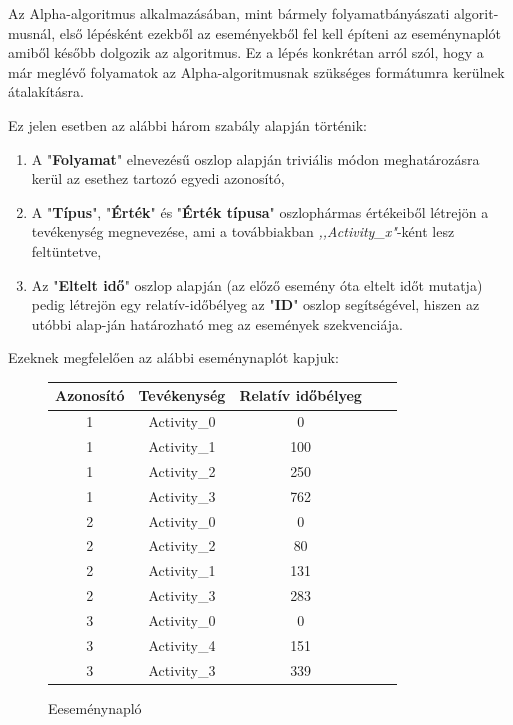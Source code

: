 Az Alpha-algoritmus alkalmazásában, mint bármely folyamatbányászati algorit\hyp{}musnál, első lépésként ezekből az eseményekből fel kell építeni az eseménynaplót amiből később dolgozik az algoritmus. Ez a lépés konkrétan arról szól, hogy a már meglévő folyamatok az Alpha-algoritmusnak szükséges formátumra kerülnek átalakításra.

Ez jelen esetben az alábbi három szabály alapján történik:
\begin{enumerate}
	\item A "\textbf{Folyamat}" elnevezésű oszlop alapján triviális módon meghatározásra kerül az esethez tartozó egyedi azonosító,
	\item A "\textbf{Típus}", "\textbf{Érték}" és "\textbf{Érték típusa}" oszlophármas értékeiből létrejön a tevékenység megnevezése,  ami a továbbiakban \textit{,,Activity\_{x}"}-ként lesz feltüntetve,
	\item Az "\textbf{Eltelt idő}" oszlop alapján (az előző esemény óta eltelt időt mutatja) pedig létrejön egy relatív-időbélyeg az "\textbf{ID}" oszlop segítségével, hiszen az utóbbi alap\hyp{}ján határozható meg az események szekvenciája.
\end{enumerate}

\newpage

Ezeknek megfelelően az alábbi eseménynaplót kapjuk:

\begin{figure}[h]
\begin{center}
\caption{Eeseménynapló}
\begin{tabular}{|| c | c | c | c | c |  ||}
	\hline
	Azonosító & Tevékenység & Relatív időbélyeg \\ [0.5ex]
	\hline\hline
	1 & Activity\_0 & 0 \\
	\hline
	1 & Activity\_1 & 100 \\
	\hline
	1 & Activity\_2 & 250 \\
	\hline
	1 & Activity\_3 & 762 \\
	\hline
	2 & Activity\_0 & 0 \\
	\hline
	2 & Activity\_2 & 80 \\
	\hline
	2 & Activity\_1 & 131 \\
	\hline
	2 & Activity\_3 & 283 \\
	\hline
	3 & Activity\_0 & 0 \\
	\hline
	3 & Activity\_4 & 151 \\
	\hline
	3 & Activity\_3 & 339 \\
	\hline
\end{tabular}
\label{fig:planexample}
\end{center}
\end{figure}	

